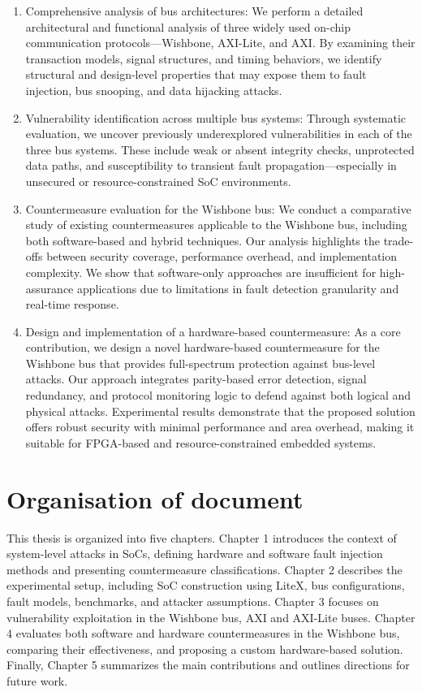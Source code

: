 \begin{enumerate}
\item Comprehensive analysis of bus architectures: We perform a detailed architectural and functional analysis of three widely used on-chip communication protocols—Wishbone, AXI-Lite, and AXI. By examining their transaction models, signal structures, and timing behaviors, we identify structural and design-level properties that may expose them to fault injection, bus snooping, and data hijacking attacks.

\item Vulnerability identification across multiple bus systems: Through systematic evaluation, we uncover previously underexplored vulnerabilities in each of the three bus systems. These include weak or absent integrity checks, unprotected data paths, and susceptibility to transient fault propagation—especially in unsecured or resource-constrained SoC environments.

\item Countermeasure evaluation for the Wishbone bus: We conduct a comparative study of existing countermeasures applicable to the Wishbone bus, including both software-based and hybrid techniques. Our analysis highlights the trade-offs between security coverage, performance overhead, and implementation complexity. We show that software-only approaches are insufficient for high-assurance applications due to limitations in fault detection granularity and real-time response.

\item Design and implementation of a hardware-based countermeasure: As a core contribution, we design a novel hardware-based countermeasure for the Wishbone bus that provides full-spectrum protection against bus-level attacks. Our approach integrates parity-based error detection, signal redundancy, and protocol monitoring logic to defend against both logical and physical attacks. Experimental results demonstrate that the proposed solution offers robust security with minimal performance and area overhead, making it suitable for FPGA-based and resource-constrained embedded systems.
\end{enumerate}

\section*{Organisation of document}

This thesis is organized into five chapters. Chapter 1 introduces the context of system-level attacks in SoCs, defining hardware and software fault injection methods and presenting countermeasure classifications. Chapter 2 describes the experimental setup, including SoC construction using LiteX, bus configurations, fault models, benchmarks, and attacker assumptions. Chapter 3 focuses on vulnerability exploitation in the Wishbone bus, AXI and AXI-Lite buses. Chapter 4 evaluates both software and hardware countermeasures in the Wishbone bus, comparing their effectiveness, and proposing a custom hardware-based solution. Finally, Chapter 5 summarizes the main contributions and outlines directions for future work.

